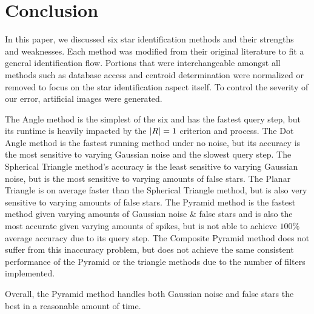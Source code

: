 \section{Conclusion}\label{sec:conclusion}
In this paper, we discussed six star identification methods and their strengths and weaknesses.
Each method was modified from their original literature to fit a general identification flow.
Portions that were interchangeable amongst all methods such as database access and centroid determination were
normalized or removed to focus on the star identification aspect itself.
To control the severity of our error, artificial images were generated.

The Angle method is the simplest of the six and has the fastest query step, but its runtime is heavily impacted by
the $\left| R \right| = 1$ criterion and  process.
The Dot Angle method is the fastest running method under no noise, but its accuracy is the most sensitive to varying
Gaussian noise and the slowest query step.
The Spherical Triangle method's accuracy is the least sensitive to varying Gaussian noise, but is the most sensitive
to varying amounts of false stars.
The Planar Triangle is on average faster than the Spherical Triangle method, but is also very sensitive to varying
amounts of false stars.
The Pyramid method is the fastest method given varying amounts of Gaussian noise \& false stars and is also the most
accurate given varying amounts of spikes, but is not able to achieve $100\%$ average accuracy due to its query step.
The Composite Pyramid method does not suffer from this inaccuracy problem, but does not achieve the same consistent
performance of the Pyramid or the triangle methods due to the number of filters implemented.

Overall, the Pyramid method handles both Gaussian noise and false stars the best in a reasonable amount of time.
